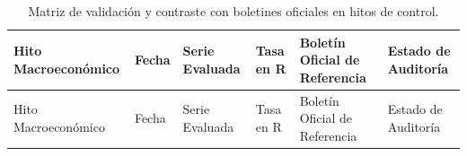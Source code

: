 \documentclass[
  10pt,
  letterpaper,
  DIV=11,
  numbers=noendperiod]{scrartcl}
\begin{document}
\begin{longtable}[]{@{}
  >{\raggedright\arraybackslash}p{}
  >{\centering\arraybackslash}p{}
  >{\raggedright\arraybackslash}p{}
  >{\centering\arraybackslash}p{}
  >{\raggedright\arraybackslash}p{}
  >{\centering\arraybackslash}p{}@{}}
\caption{Matriz de validación y contraste con boletines oficiales en
hitos de control.}\label{tbl-validacion-boletines}\tabularnewline
\toprule\noalign{}
\begin{minipage}[b]{\linewidth}\raggedright
Hito Macroeconómico
\end{minipage} & \begin{minipage}[b]{\linewidth}\centering
Fecha
\end{minipage} & \begin{minipage}[b]{\linewidth}\raggedright
Serie Evaluada
\end{minipage} & \begin{minipage}[b]{\linewidth}\centering
Tasa en R
\end{minipage} & \begin{minipage}[b]{\linewidth}\raggedright
Boletín Oficial de Referencia
\end{minipage} & \begin{minipage}[b]{\linewidth}\centering
Estado de Auditoría
\end{minipage} \\
\midrule\noalign{}
\endfirsthead
\toprule\noalign{}
\begin{minipage}[b]{\linewidth}\raggedright
Hito Macroeconómico
\end{minipage} & \begin{minipage}[b]{\linewidth}\centering
Fecha
\end{minipage} & \begin{minipage}[b]{\linewidth}\raggedright
Serie Evaluada
\end{minipage} & \begin{minipage}[b]{\linewidth}\centering
Tasa en R
\end{minipage} & \begin{minipage}[b]{\linewidth}\raggedright
Boletín Oficial de Referencia
\end{minipage} & \begin{minipage}[b]{\linewidth}\centering
Estado de Auditoría

\end{minipage}
\end{longtable}
\end{document}
